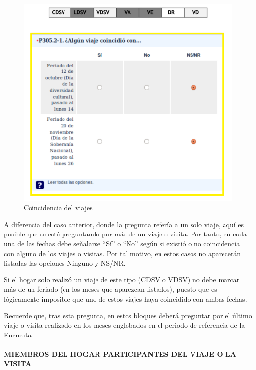 \documentclass[
  openany]{book}
\begin{document}
\begin{figure}

{\centering \includegraphics[width=1\linewidth]{imagenes/figura6-91} 

}

\caption{Coincidencia del viajes}\label{fig:coincidencias2}
\end{figure}

A diferencia del caso anterior, donde la pregunta refería a un solo viaje, aquí es posible que se esté preguntando por más de un viaje o visita. Por tanto, en cada una de las fechas debe señalarse ``Sí'' o ``No'' según si existió o no coincidencia con alguno de los viajes o visitas. Por tal motivo, en estos casos no aparecerán listadas las opciones Ninguno y NS/NR.

Si el hogar solo realizó un viaje de este tipo (CDSV o VDSV) no debe marcar más de un feriado (en los meses que aparezcan listados), puesto que es lógicamente imposible que uno de estos viajes haya coincidido con ambas fechas.

Recuerde que, tras esta pregunta, en estos bloques deberá preguntar por el último viaje o visita realizado en los meses englobados en el periodo de referencia de la Encuesta.

\hypertarget{miembros-del-hogar-participantes-del-viaje-o-la-visita}{%
\paragraph{\texorpdfstring{\textbf{MIEMBROS DEL HOGAR PARTICIPANTES DEL VIAJE O LA VISITA}}{MIEMBROS DEL HOGAR PARTICIPANTES DEL VIAJE O LA VISITA}}\label{miembros-del-hogar-participantes-del-viaje-o-la-visita}}
\end{document}
